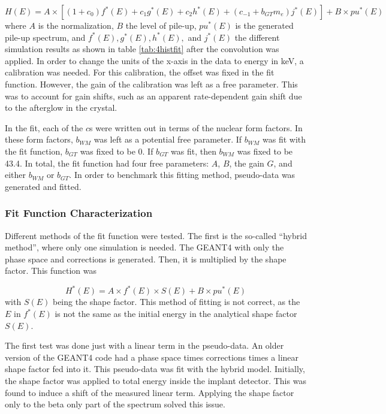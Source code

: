 \documentclass[../MaxHughesThesis.tex]{subfiles}
\begin{document}
\begin{equation}
	H(E) = A \times [( 1 + c_{0}) f^{*}(E) + c_{1}g^{*}(E) + c_{2} h^{*}(E) + (c_{-1} + b_{GT} m_{e}) j^{*}(E)] + B \times pu^{*}(E)
	\label{eq:betafit}
\end{equation}
where $A$ is the normalization, $B$ the level of pile-up, $pu^{*}(E)$ is the generated pile-up spectrum, and $f^{*}(E),g^{*}(E),h^{*}(E),$ and $j^{*}(E)$ the different simulation results as shown in table \ref{tab:4histfit} after the convolution was applied.
In order to change the units of the x-axis in the data to energy in keV, a calibration was needed.
For this calibration, the offset was fixed in the fit function.
However, the gain of the calibration was left as a free parameter.
This was to account for gain shifts, such as an apparent rate-dependent gain shift due to the afterglow in the crystal.

In the fit, each of the $c$s were written out in terms of the nuclear form factors.
In these form factors, $b_{WM}$ was left as a potential free parameter. 
If $b_{WM}$ was fit with the fit function, $b_{GT}$ was fixed to be 0. 
If $b_{GT}$ was fit, then $b_{WM}$ was fixed to be 43.4. 
In total, the fit function had four free parameters: $A$, $B$, the gain $G$, and either $b_{WM}$ or $b_{GT}$. 
In order to benchmark this fitting method, pseudo-data was generated and fitted.

\subsubsection{Fit Function Characterization}
Different methods of the fit function were tested. 
The first is the so-called ``hybrid method'', where only one simulation is needed.
The GEANT4 with only the phase space and corrections is generated. 
Then, it is multiplied by the shape factor.
This function was 

\begin{equation}
	H^{*}(E) = A \times f^{*}(E) \times S(E) + B \times pu^{*}(E)
	\label{eq:hybridmodel}
\end{equation}
with $S(E)$ being the shape factor. 
This method of fitting is not correct, as the $E$ in $f^{*}(E)$ is not the same as the initial energy in the analytical shape factor $S(E)$. 

The first test was done just with a linear term in the pseudo-data.
An older version of the GEANT4 code had a phase space times corrections times a linear shape factor fed into it.
This pseudo-data was fit with the hybrid model.
Initially, the shape factor was applied to total energy inside the implant detector.
This was found to induce a shift of the measured linear term.
Applying the shape factor only to the beta only part of the spectrum solved this issue. 
\end{document}
